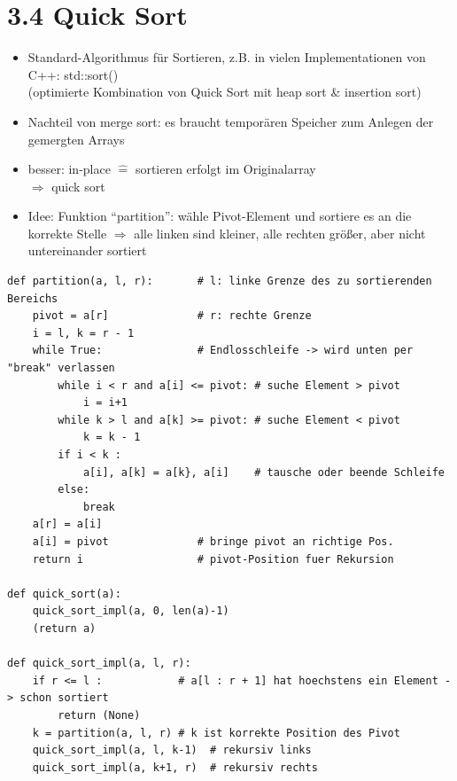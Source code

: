 \documentclass[11pt, fleqn]{scrreprt}
\begin{document}
    \section*{3.4 Quick Sort}

    \begin{itemize}
        \item Standard-Algorithmus für Sortieren, z.B. in vielen Implementationen von C++:  std::sort() \\
        (optimierte Kombination von Quick Sort mit heap sort \& insertion sort)
        \item Nachteil von merge sort: es braucht temporären Speicher zum Anlegen der gemergten Arrays
        \item besser: in-place $\widehat{=}$ sortieren erfolgt im Originalarray \\
        $\Rightarrow$ quick sort
        \item Idee: Funktion ``partition'': wähle Pivot-Element und sortiere es an die korrekte Stelle $\Rightarrow$ alle linken sind kleiner, alle rechten größer, aber nicht untereinander sortiert
    \end{itemize}

    \begin{verbatim}
def partition(a, l, r):       # l: linke Grenze des zu sortierenden Bereichs
    pivot = a[r]              # r: rechte Grenze
    i = l, k = r - 1
    while True:               # Endlosschleife -> wird unten per "break" verlassen
        while i < r and a[i] <= pivot: # suche Element > pivot
            i = i+1
        while k > l and a[k] >= pivot: # suche Element < pivot
            k = k - 1
        if i < k :
            a[i], a[k] = a[k}, a[i]    # tausche oder beende Schleife
        else:
            break
    a[r] = a[i]
    a[i] = pivot              # bringe pivot an richtige Pos.
    return i                  # pivot-Position fuer Rekursion

def quick_sort(a):
    quick_sort_impl(a, 0, len(a)-1)
    (return a)

def quick_sort_impl(a, l, r):
    if r <= l :            # a[l : r + 1] hat hoechstens ein Element -> schon sortiert
        return (None)
    k = partition(a, l, r) # k ist korrekte Position des Pivot
    quick_sort_impl(a, l, k-1)  # rekursiv links
    quick_sort_impl(a, k+1, r)  # rekursiv rechts
    \end{verbatim}
\end{document}
